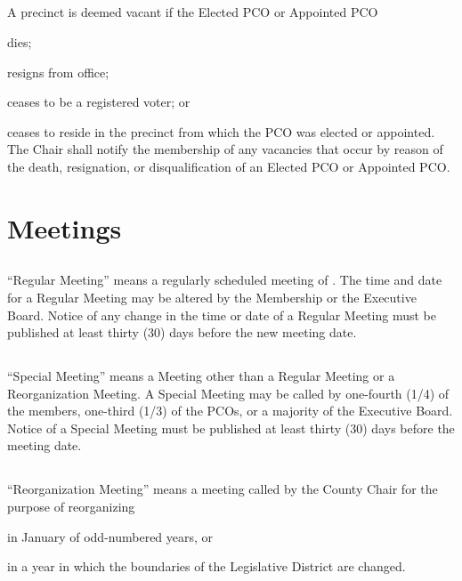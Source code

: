 \subsection{}
A precinct is deemed vacant if the Elected PCO or Appointed PCO
\begin{inlinealphalist}
    \item dies;
    \item resigns from office;
    \item ceases to be a registered voter; or
    \item ceases to reside in the precinct from which the PCO was elected or appointed. The Chair shall notify the membership of any vacancies that occur by reason of the death, resignation, or disqualification of an Elected PCO or Appointed PCO.
\end{inlinealphalist}

\section{Meetings}
\subsection{} \label{regular-meeting}
“Regular Meeting” means a regularly scheduled meeting of \thedistrict{}. The time and date for a Regular Meeting may be altered by the Membership or the Executive Board. Notice of any change in the time or date of a Regular Meeting must be published at least thirty (30) days before the new meeting date.

\subsection{} \label{special-meeting}
“Special Meeting” means a Meeting other than a Regular Meeting or a Reorganization Meeting. A Special Meeting may be called by one-fourth (1/4) of the members, one-third (1/3) of the PCOs, or a majority of the Executive Board. Notice of a Special Meeting must be published at least thirty (30) days before the meeting date.

\subsection{} \label{reorg-meeting}
“Reorganization Meeting” means a meeting called by the County Chair for the purpose of reorganizing \thedistrict{}
\begin{inlinealphalist}
    \item in January of odd-numbered years, or
    \item in a year in which the boundaries of the \fortythird{} Legislative District are changed.
\end{inlinealphalist}

